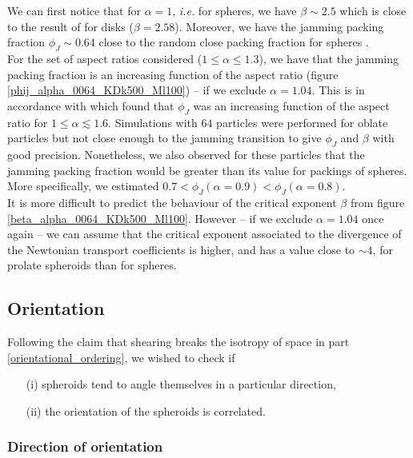 \documentclass[class=report, float=false, crop=false]{standalone}
\begin{document}
We can first notice that for $\alpha=1$, \textit{i.e.} for spheres, we have $\beta\sim2.5$ which is close to the result of \cite{PRL109.108001} for disks ($\beta=2.58$). Moreover, we have the jamming packing fraction $\phi_J\sim0.64$ close to the random close packing fraction for spheres \cite{donev2004improving}.\\

For the set of aspect ratios considered ($1\le\alpha\le1.3$), we have that the jamming packing fraction is an increasing function of the aspect ratio (figure \ref{phij_alpha_0064_KDk500_Ml100}) -- if we exclude $\alpha=1.04$. This is in accordance with \cite{donev2004improving} which found that $\phi_J$ was an increasing function of the aspect ratio for $1\le\alpha\lesssim1.6$. Simulations with $64$ particles were performed for oblate particles but not close enough to the jamming transition to give $\phi_J$ and $\beta$ with good precision. Nonetheless, we also observed for these particles that the jamming packing fraction would be greater than its value for packings of spheres. More specifically, we estimated $0.7 < \phi_J(\alpha=0.9) < \phi_J(\alpha=0.8)$.\\

It is more difficult to predict the behaviour of the critical exponent $\beta$ from figure \ref{beta_alpha_0064_KDk500_Ml100}. However -- if we exclude $\alpha=1.04$ once again -- we can assume that the critical exponent associated to the divergence of the Newtonian transport coefficients is higher, and has a value close to $\sim 4$, for prolate spheroids than for spheres.

\subsection{Orientation}

Following the claim that shearing breaks the isotropy of space in part \ref{orientational_ordering}, we wished to check if
\begin{itemize}
\item[(i)] spheroids tend to angle themselves in a particular direction,
\item[(ii)] the orientation of the spheroids is correlated.
\end{itemize}

\subsubsection{Direction of orientation}
\end{document}
